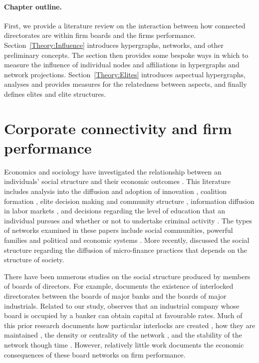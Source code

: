 \paragraph{Chapter outline.}

First, we provide a literature review on the interaction between how connected directorates are within firm boards and the firms performance. Section~\ref{Theory:Influence} introduces hypergraphs, networks, and other preliminary concepts. The section then provides some bespoke ways in which to measure the influence of individual nodes and affiliations in hypergraphs and network projections. Section~\ref{Theory:Elites} introduces aspectual hypergraphs, analyses and provides measures for the relatedness between aspects, and finally defines elites and elite structures.

\section{Corporate connectivity and firm performance} \label{Literature}

Economics and sociology have investigated the relationship between an individuals' social structure and their economic outcomes \citep{Granovetter1985}. This literature includes analysis into the diffusion and adoption of innovation \citep{Coleman1966}, coalition formation \citep{Kapferer1969}, elite decision making and community structure \citep{LaumannGalaskiewiczMarsden1978}, information diffusion in labor markets \citep{Granovetter1973}, and decisions regarding the level of education that an individual pursues and whether or not to undertake criminal activity \citep{BallesterZenou2006, Jackson2007}. The types of networks examined in these papers include social communities, powerful families and political and economic systems \citep{Padgett1993, Padgett1994}. More recently, \citet{Banerjee2013} discussed the social structure regarding the diffusion of micro-finance practices that depends on the structure of society.


There have been numerous studies on the social structure produced by members of boards of directors. For example, \citet{Levine1972} documents the existence of interlocked directorates between the boards of major banks and the boards of major industrials. Related to our study, \citet{Dooley1969} observes that an industrial company whose board is occupied by a banker can obtain capital at favourable rates. Much of this prior research documents how particular interlocks are created \citep{PfefferSalancik1978}, how they are maintained \citep{Palmer1983, PalmerFriedlandSingh1986}, the density or centrality of the network \citep{DavisYooBaker2003}, and the stability of the network though time \citep{BeckmanHaunschildPhillips2004}. However, relatively little work documents the economic consequences of these board networks on firm performance.

